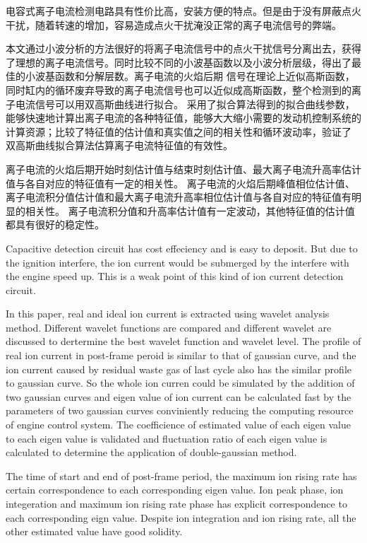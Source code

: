 \begin{cabstract}
电容式离子电流检测电路具有性价比高，安装方便的特点。但是由于没有屏蔽点火干扰，随着转速的增加，容易造成点火干扰淹没正常的离子电流信号的弊端。\par
本文通过小波分析的方法很好的将离子电流信号中的点火干扰信号分离出去，获得了理想的离子电流信号。同时比较不同的小波基函数以及小波分析层级，得出了最佳的小波基函数和分解层数。离子电流的火焰后期
信号在理论上近似高斯函数，同时缸内的循环废弃导致的离子电流信号也可以近似成高斯函数，整个检测到的离子电流信号可以用双高斯曲线进行拟合。
采用了拟合算法得到的拟合曲线参数，能够快速地计算出离子电流的各种特征值，能够大大缩小需要的发动机控制系统的计算资源；比较了特征值的估计值和真实值之间的相关性和循环波动率，验证了
双高斯曲线拟合算法估算离子电流特征值的有效性。\par
离子电流的火焰后期开始时刻估计值与结束时刻估计值、最大离子电流升高率估计值与各自对应的特征值有一定的相关性。
离子电流的火焰后期峰值相位估计值、离子电流积分值估计值和最大离子电流升高率相位估计值与各自对应的特征值有明显的相关性。
离子电流积分值和升高率估计值有一定波动，其他特征值的估计值都具有很好的稳定性。
\end{cabstract}


\begin{eabstract}
Capacitive detection circuit has cost effeciency and is easy to deposit. 
But due to the ignition interfere, the ion current would be submerged by the interfere with the engine speed up.
This is a weak point of this kind of ion current detection circuit.\par
In this paper, real and ideal ion current is extracted
using wavelet analysis method. Different wavelet functions are compared and different wavelet are discussed to dertermine
the best wavelet function and wavelet level. The profile of real ion current in post-frame peroid is similar to that of 
gaussian curve, and the ion current caused by residual waste gas of last cycle also has the similar profile to gaussian
 curve. So the whole ion curren could be simulated by the addition of two gaussian curves and eigen value of ion current
 can be calculated fast by the parameters of two gaussian curves conviniently reducing the computing resource of engine control 
 system. The coefficience of estimated value of each eigen value to each eigen value is validated and fluctuation ratio 
 of each eigen value is calculated to determine the application of double-gaussian method.\par
The time of start and end of post-frame period, the maximum ion rising rate has certain
correspondence to each corresponding eigen value. Ion peak phase, ion integeration and maximum ion
rising rate phase has explicit correspondence to each corresponding eign value.
Despite ion integration and ion rising rate, all the other estimated value have good solidity.
\end{eabstract}

